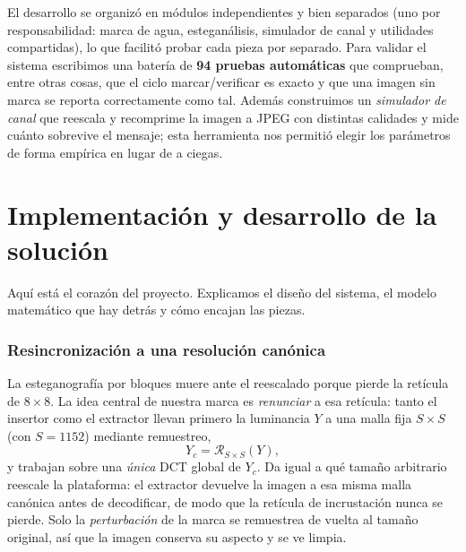 \documentclass[12pt,a4paper]{article}
\begin{document}
El desarrollo se organizó en módulos independientes y bien separados (uno por
responsabilidad: marca de agua, esteganálisis, simulador de canal y utilidades compartidas),
lo que facilitó probar cada pieza por separado. Para validar el sistema escribimos una
batería de \textbf{94 pruebas automáticas} que comprueban, entre otras cosas, que el ciclo
marcar/verificar es exacto y que una imagen sin marca se reporta correctamente como tal.
Además construimos un \emph{simulador de canal} que reescala y recomprime la imagen a JPEG
con distintas calidades y mide cuánto sobrevive el mensaje; esta herramienta nos permitió
elegir los parámetros de forma empírica en lugar de a ciegas.

\section{Implementación y desarrollo de la solución}
\label{sec:impl}

Aquí está el corazón del proyecto. Explicamos el diseño del sistema, el modelo matemático
que hay detrás y cómo encajan las piezas.

\subsubsection*{Resincronización a una resolución canónica}
La esteganografía por bloques muere ante el reescalado porque pierde la retícula de $8\times8$.
La idea central de nuestra marca es \emph{renunciar} a esa retícula: tanto el insertor como el extractor llevan
primero la luminancia $Y$ a una malla fija $S\times S$ (con $S=1152$) mediante remuestreo,
\begin{equation}
Y_c = \mathcal{R}_{S\times S}(Y),
\end{equation}
y trabajan sobre una \emph{única} DCT global de $Y_c$. Da igual a qué tamaño arbitrario
reescale la plataforma: el extractor devuelve la imagen a esa misma malla canónica antes de
decodificar, de modo que la retícula de incrustación nunca se pierde. Solo la
\emph{perturbación} de la marca se remuestrea de vuelta al tamaño original, así que la
imagen conserva su aspecto y se ve limpia.
\end{document}

